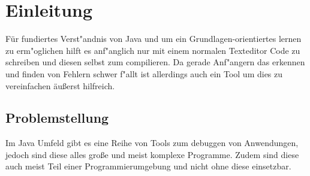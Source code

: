 
\chapter{Einleitung}

Für fundiertes Verst"andnis von Java und um ein Grundlagen-orientiertes lernen zu erm"oglichen hilft es anf"anglich nur mit einem normalen Texteditor Code zu schreiben und diesen selbst zum compilieren. Da gerade Anf"angern das erkennen und finden von Fehlern schwer f"allt ist allerdings auch ein Tool um dies zu vereinfachen \"au\ss{}erst hilfreich.

\section{Problemstellung} 

Im Java Umfeld gibt es eine Reihe von Tools zum debuggen von Anwendungen, jedoch sind diese alles große und meist komplexe Programme. Zudem sind diese auch meist Teil einer Programmierumgebung und nicht ohne diese einsetzbar. 
